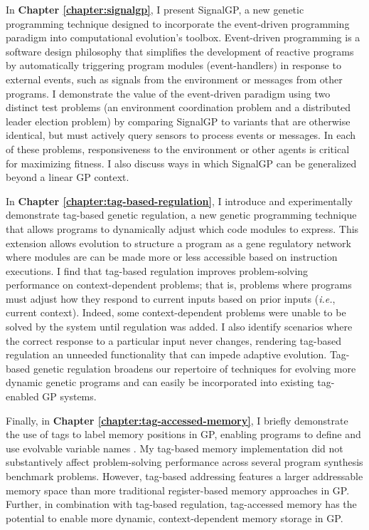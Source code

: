 In \textbf{Chapter \ref{chapter:signalgp}}, I present SignalGP, a new genetic programming technique designed to incorporate the event-driven programming paradigm into computational evolution's toolbox. 
Event-driven programming is a software design philosophy that simplifies the development of reactive programs by automatically triggering program modules (event-handlers) in response to external events, such as signals from the environment or messages from other programs. 
I demonstrate the value of the event-driven paradigm using two distinct test problems (an environment coordination problem and a distributed leader election problem) by comparing SignalGP to variants that are otherwise identical, but must actively query sensors to process events or messages. 
In each of these problems, responsiveness to the environment or other agents is critical for maximizing fitness. 
I also discuss ways in which SignalGP can be generalized beyond a linear GP context.

In \textbf{Chapter \ref{chapter:tag-based-regulation}}, I introduce and experimentally demonstrate tag-based genetic regulation, a new genetic programming technique that allows programs to dynamically adjust which code modules to express.
This extension allows evolution to structure a program as a gene regulatory network where modules are can be made more or less accessible based on instruction executions.
I find that tag-based regulation improves problem-solving performance on context-dependent problems; that is, problems where programs must adjust how they respond to current inputs based on prior inputs (\textit{i.e.}, current context).
Indeed, some context-dependent problems were unable to be solved by the system until regulation was added.
I also identify scenarios where the correct response to a particular input never changes, rendering tag-based regulation an unneeded functionality that can impede adaptive evolution.
Tag-based genetic regulation broadens our repertoire of techniques for evolving more dynamic genetic programs and can easily be incorporated into existing tag-enabled GP systems.

Finally, in \textbf{Chapter \ref{chapter:tag-accessed-memory}}, I briefly demonstrate the use of tags to label memory positions in GP, enabling programs to define and use evolvable variable names \citep{lalejini_tag-accessed_2019}.
My tag-based memory implementation did not substantively affect problem-solving performance across several program synthesis benchmark problems.
However, tag-based addressing features a larger addressable memory space than more traditional register-based memory approaches in GP.
Further, in combination with tag-based regulation, tag-accessed memory has the potential to enable more dynamic, context-dependent memory storage in GP.
